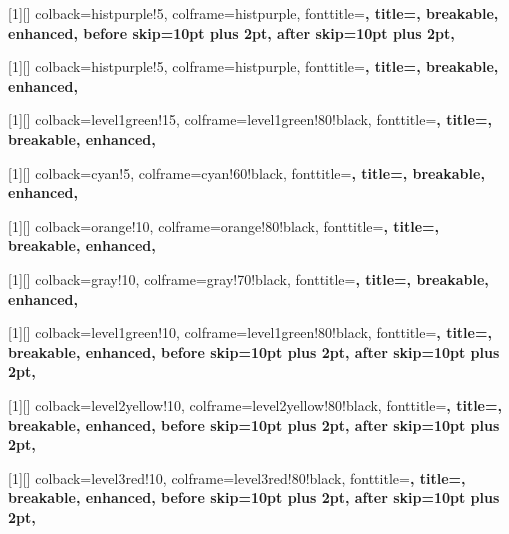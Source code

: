 [1][\relax]{
  colback=histpurple!5,
  colframe=histpurple,
  fonttitle=\bfseries,
  title={},
  breakable,
  enhanced,
  before skip=10pt plus 2pt,
  after skip=10pt plus 2pt,
}

[1][\relax]{
  colback=histpurple!5,
  colframe=histpurple,
  fonttitle=\bfseries,
  title={},
  breakable,
  enhanced,
}


[1][\relax]{
  colback=level1green!15,
  colframe=level1green!80!black,
  fonttitle=\bfseries,
  title={},
  breakable,
  enhanced,
}

[1][\relax]{
  colback=cyan!5,
  colframe=cyan!60!black,
  fonttitle=\bfseries,
  title={},
  breakable,
  enhanced,
}

[1][\relax]{
  colback=orange!10,
  colframe=orange!80!black,
  fonttitle=\bfseries,
  title={},
  breakable,
  enhanced,
}

[1][\relax]{
  colback=gray!10,
  colframe=gray!70!black,
  fonttitle=\bfseries\Large,
  title={},
  breakable,
  enhanced,
}

[1][\relax]{
  colback=level1green!10,
  colframe=level1green!80!black,
  fonttitle=\bfseries,
  title={},
  breakable,
  enhanced,
  before skip=10pt plus 2pt,
  after skip=10pt plus 2pt,
}

[1][\relax]{
  colback=level2yellow!10,
  colframe=level2yellow!80!black,
  fonttitle=\bfseries,
  title={},
  breakable,
  enhanced,
  before skip=10pt plus 2pt,
  after skip=10pt plus 2pt,
}

[1][\relax]{
  colback=level3red!10,
  colframe=level3red!80!black,
  fonttitle=\bfseries,
  title={},
  breakable,
  enhanced,
  before skip=10pt plus 2pt,
  after skip=10pt plus 2pt,
}


